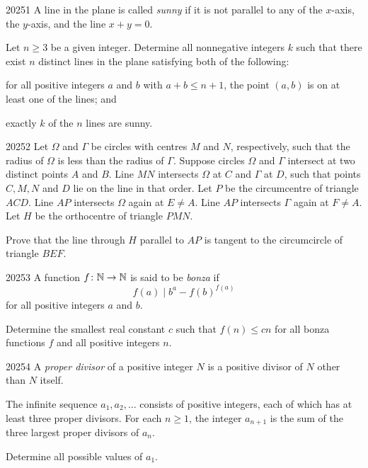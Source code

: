 
\begin{problem}{2025}{1}
A line in the plane is called \emph{sunny} if it is not parallel to any of the $x$-axis, the $y$-axis, and the line $x+y=0$.

Let $n\geq3$ be a given integer. Determine all nonnegative integers $k$ such that there exist $n$ distinct lines in the plane satisfying both of the following:
\begin{problemitems}
    \item for all positive integers $a$ and $b$ with $a+b\leq n+1$, the point $(a, b)$ is on at least one of the lines; and
    \item exactly $k$ of the $n$ lines are sunny.
\end{problemitems}
\end{problem}

\begin{problem}{2025}{2}
Let $\Omega$ and $\Gamma$ be circles with centres $M$ and $N$, respectively, such that the radius of $\Omega$ is less than the radius of $\Gamma$. Suppose circles $\Omega$ and $\Gamma$ intersect at two distinct points $A$ and $B$. Line $MN$ intersects $\Omega$ at $C$ and $\Gamma$ at $D$, such that points $C, M, N$ and $D$ lie on the line in that order. Let $P$ be the circumcentre of triangle $ACD$. Line $AP$ intersects $\Omega$ again at $E\ne A$. Line $AP$ intersects $\Gamma$ again at $F\ne A$. Let $H$ be the orthocentre of triangle $PMN$.

Prove that the line through $H$ parallel to $AP$ is tangent to the circumcircle of triangle $BEF$.
\end{problem}

\begin{problem}{2025}{3}
A function $f\colon\mathbb{N}\to\mathbb{N}$ is said to be \emph{bonza} if
\[
    f(a)\mid b^a-f(b)^{f(a)}
\]
for all positive integers $a$ and $b$.

Determine the smallest real constant $c$ such that $f(n)\leq cn$ for all bonza functions $f$ and all positive integers $n$.
\end{problem}

\begin{problem}{2025}{4}
A \emph{proper divisor} of a positive integer $N$ is a positive divisor of $N$ other than $N$ itself.

The infinite sequence $a_1, a_2, \dots$ consists of positive integers, each of which has at least three proper divisors. For each $n\geq1$, the integer $a_{n+1}$ is the sum of the three largest proper divisors of $a_n$.

Determine all possible values of $a_1$.
\end{problem}

